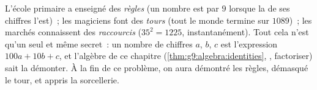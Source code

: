 \begin{problem}
\label{pb:g9:algebra:1}
L'école primaire a enseigné des \emph{règles} (un nombre est
 par $9$ lorsque la  de ses chiffres l'est)~; les
magiciens font des \emph{tours} (tout le monde termine sur $1089$)~;
les marchés connaissent des \emph{raccourcis} ($35^2 = 1225$,
instantanément). Tout cela n'est qu'un seul et même secret~: un
nombre de chiffres $a$, $b$, $c$ est l'expression $100a + 10b + c$,
et l'algèbre de ce chapitre (\cref{thm:g9:algebra:identities},
, factoriser) sait la démonter. À la fin de ce problème, on
aura démontré les règles, démasqué le tour, et appris la
sorcellerie.


\end{problem}
